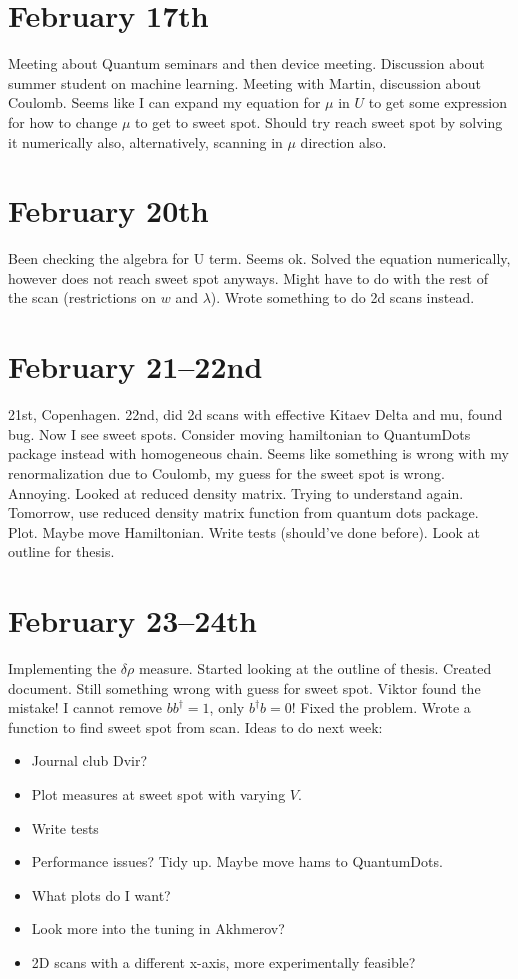 \documentclass{article}
\begin{document}
\section*{February 17th}
Meeting about Quantum seminars and then device meeting. Discussion about summer student on machine learning. Meeting with Martin, discussion about Coulomb. Seems like I can expand my equation for $\mu$ in $U$ to get some expression for how to change $\mu$ to get to sweet spot. Should try reach sweet spot by solving it numerically also, alternatively, scanning in $\mu$ direction also.
\section*{February 20th}
Been checking the algebra for U term. Seems ok. Solved the equation numerically, however does not reach sweet spot anyways. Might have to do with the rest of the scan (restrictions on $w$ and $\lambda$). Wrote something to do 2d scans instead.
\section*{February 21--22nd}
21st, Copenhagen. 22nd, did 2d scans with effective Kitaev Delta and mu, found bug. Now I see sweet spots. Consider moving hamiltonian to QuantumDots package instead with homogeneous chain. Seems like something is wrong with my renormalization due to Coulomb, my guess for the sweet spot is wrong. Annoying. Looked at reduced density matrix. Trying to understand again. Tomorrow, use reduced density matrix function from quantum dots package. Plot. Maybe move Hamiltonian. Write tests (should've done before). Look at outline for thesis.
\section*{February 23--24th}
Implementing the $\delta\rho$ measure. Started looking at the outline of thesis. Created document. Still something wrong with guess for sweet spot. Viktor found the mistake! I cannot remove $bb^\dagger = 1$, only $b^\dagger b = 0$! Fixed the problem. Wrote a function to find sweet spot from scan. Ideas to do next week: 
\begin{itemize}
    \item Journal club Dvir?
    \item Plot measures at sweet spot with varying $V$.
    \item Write tests
    \item Performance issues? Tidy up. Maybe move hams to QuantumDots.
    \item What plots do I want?
    \item Look more into the tuning in Akhmerov?
    \item 2D scans with a different x-axis, more experimentally feasible?
\end{itemize}
\end{document}
